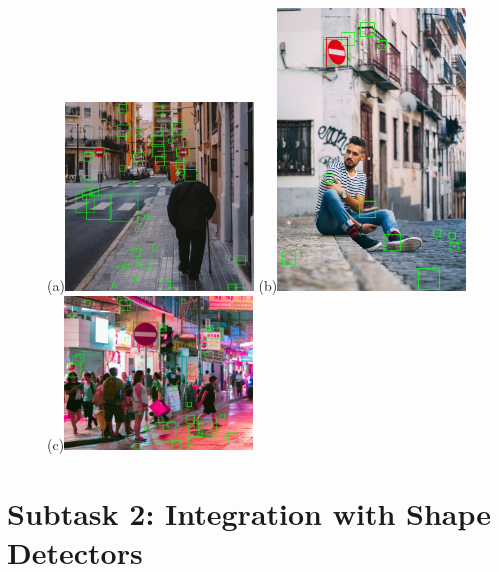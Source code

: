 \documentclass{article}
\begin{document}
\begin{figure}
    \centering
    
    \subfigure(a){\includegraphics[width=50mm]{subtask1/result0.jpg}} 
    \subfigure(b){\includegraphics[width=50mm]{subtask1/result1.jpg}} 
    \subfigure(c){\includegraphics[width=50mm]{subtask1/result2.jpg}}
     
    \label{fig:foobar}
\end{figure}

\section{Subtask 2: Integration with Shape Detectors}
\end{document}
